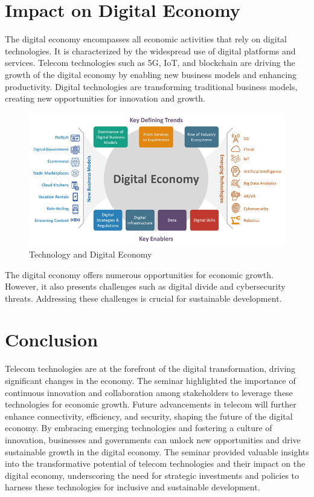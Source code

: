 \documentclass[conference]{IEEEtran}
\begin{document}
\section{Impact on Digital Economy}
The digital economy encompasses all economic activities that rely on digital technologies. It is characterized by the widespread use of digital platforms and services.
Telecom technologies such as 5G, IoT, and blockchain are driving the growth of the digital economy by enabling new business models and enhancing productivity.
Digital technologies are transforming traditional business models, creating new opportunities for innovation and growth.
\begin{figure}[htbp]
    \centering
    \includegraphics[width=\linewidth]{images/digital-economy.jpg}
    \caption{Technology and Digital Economy}
    \label{fig:digital-economy}
\end{figure}
\par The digital economy offers numerous opportunities for economic growth. However, it also presents challenges such as digital divide and cybersecurity threats. Addressing these challenges is crucial for sustainable development.

\section{Conclusion}
Telecom technologies are at the forefront of the digital transformation, driving significant changes in the economy. The seminar highlighted the importance of continuous innovation and collaboration among stakeholders to leverage these technologies for economic growth. Future advancements in telecom will further enhance connectivity, efficiency, and security, shaping the future of the digital economy. By embracing emerging technologies and fostering a culture of innovation, businesses and governments can unlock new opportunities and drive sustainable growth in the digital economy. The seminar provided valuable insights into the transformative potential of telecom technologies and their impact on the digital economy, underscoring the need for strategic investments and policies to harness these technologies for inclusive and sustainable development. 
\end{document}
